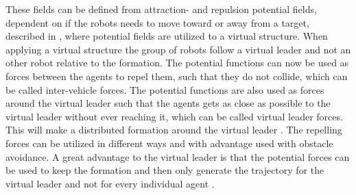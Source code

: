 These fields can be defined from attraction- and repulsion potential fields, dependent on if the robots needs to move toward or away from a target, described in \citep{pfmrm}, where potential fields are utilized to a virtual structure. When applying a virtual structure the group of robots follow a virtual leader and not an other robot relative to the formation. The potential functions can now be used as forces between the agents to repel them, such that they do not collide, which can be called inter-vehicle forces. The potential functions are also used as forces around the virtual leader such that the agents gets as close as possible to the virtual leader without ever reaching it, which can be called virtual leader forces. This will make a distributed formation around the virtual leader \citep{1655803}. The repelling forces can be utilized in different ways and with advantage used with obstacle avoidance. A great advantage to the virtual leader is that the potential forces can be used to keep the formation and then only generate the trajectory for the virtual leader and not for every individual agent \citep{1655803}.



